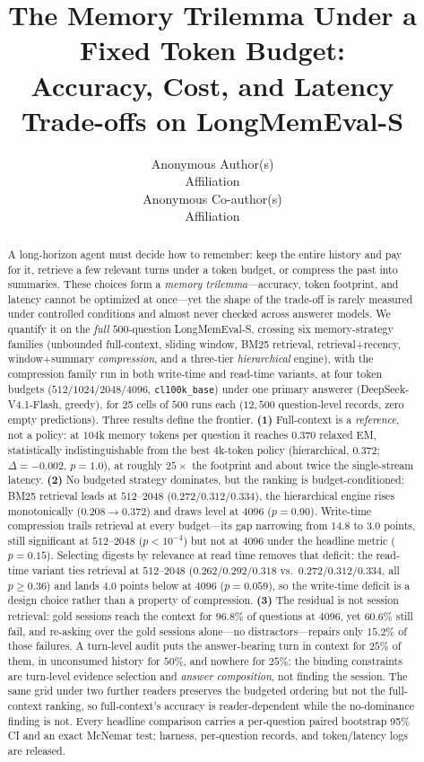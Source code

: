 \documentclass{article} %
\title{The Memory Trilemma Under a Fixed Token Budget:\\ Accuracy, Cost, and Latency Trade-offs on LongMemEval-S}
\author{Anonymous Author(s) \\
Affiliation \\
\And
Anonymous Co-author(s) \\
Affiliation}
\begin{document}
\maketitle

\begin{abstract}
A long-horizon agent must decide how to remember: keep the entire history and pay
for it, retrieve a few relevant turns under a token budget, or compress the past into
summaries. These choices form a \emph{memory trilemma}---accuracy, token footprint,
and latency cannot be optimized at once---yet the shape of the trade-off is rarely
measured under controlled conditions and almost never checked across answerer models.
We quantify it on the \emph{full} $500$-question LongMemEval-S, crossing six memory-strategy
families (unbounded full-context, sliding window, BM25 retrieval, retrieval+recency,
window+summary \emph{compression}, and a three-tier \emph{hierarchical} engine), with the
compression family run in both write-time and read-time variants, at four token budgets
($512/1024/2048/4096$, \texttt{cl100k\_base}) under one primary answerer
(DeepSeek-V4.1-Flash, greedy), for 25 cells of $500$ runs each ($12{,}500$ question-level
records, zero empty predictions). Three results define the frontier.
\textbf{(1)} Full-context is a \emph{reference}, not a policy: at $104$k memory tokens per
question it reaches $0.370$ relaxed EM, statistically indistinguishable from the best
$4$k-token policy (hierarchical, $0.372$; $\Delta{=}-0.002$, $p{=}1.0$), at roughly
$25\times$ the footprint and about twice the single-stream latency. \textbf{(2)} No budgeted strategy
dominates, but the ranking is budget-conditioned: BM25 retrieval leads at $512$--$2048$
($0.272/0.312/0.334$), the hierarchical engine rises monotonically
($0.208\rightarrow0.372$) and draws level at $4096$ ($p{=}0.90$). Write-time compression
trails retrieval at every budget---its gap narrowing from $14.8$ to $3.0$ points, still
significant at $512$--$2048$ ($p<10^{-4}$) but not at $4096$ under the headline metric
($p{=}0.15$). Selecting digests by relevance at read time removes that deficit: the
read-time variant ties retrieval at $512$--$2048$ ($0.262/0.292/0.318$ vs.\
$0.272/0.312/0.334$, all $p\geq0.36$) and lands $4.0$ points below at $4096$
($p{=}0.059$), so the write-time deficit is a design choice rather than a property of
compression. \textbf{(3)} The residual is not session
retrieval: gold sessions reach the context for $96.8\%$ of questions at $4096$, yet
$60.6\%$ still fail, and re-asking over the gold sessions alone---no distractors---repairs
only $15.2\%$ of those failures. A turn-level audit puts the answer-bearing turn in
context for $25\%$ of them, in unconsumed history for $50\%$, and nowhere for $25\%$:
the binding constraints are turn-level evidence selection and \emph{answer composition},
not finding the session. The same grid under two further readers preserves the budgeted ordering but not the
full-context ranking, so full-context's accuracy is reader-dependent while the no-dominance
finding is not. Every headline comparison carries
a per-question paired bootstrap 95\% CI and an exact McNemar test; harness, per-question
records, and token/latency logs are released.
\end{abstract}
\end{document}
